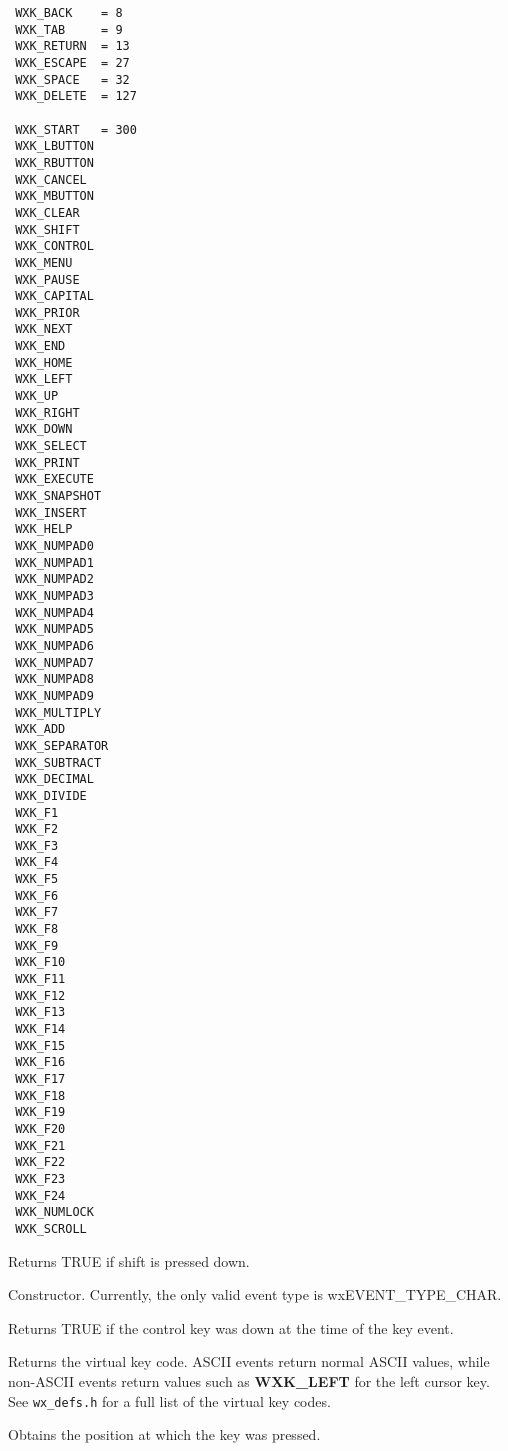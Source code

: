 \begin{verbatim}
 WXK_BACK    = 8
 WXK_TAB     = 9
 WXK_RETURN  = 13
 WXK_ESCAPE  = 27
 WXK_SPACE   = 32
 WXK_DELETE  = 127

 WXK_START   = 300
 WXK_LBUTTON
 WXK_RBUTTON
 WXK_CANCEL
 WXK_MBUTTON
 WXK_CLEAR
 WXK_SHIFT
 WXK_CONTROL
 WXK_MENU
 WXK_PAUSE
 WXK_CAPITAL
 WXK_PRIOR
 WXK_NEXT
 WXK_END
 WXK_HOME
 WXK_LEFT
 WXK_UP
 WXK_RIGHT
 WXK_DOWN
 WXK_SELECT
 WXK_PRINT
 WXK_EXECUTE
 WXK_SNAPSHOT
 WXK_INSERT
 WXK_HELP
 WXK_NUMPAD0
 WXK_NUMPAD1
 WXK_NUMPAD2
 WXK_NUMPAD3
 WXK_NUMPAD4
 WXK_NUMPAD5
 WXK_NUMPAD6
 WXK_NUMPAD7
 WXK_NUMPAD8
 WXK_NUMPAD9
 WXK_MULTIPLY
 WXK_ADD
 WXK_SEPARATOR
 WXK_SUBTRACT
 WXK_DECIMAL
 WXK_DIVIDE
 WXK_F1
 WXK_F2
 WXK_F3
 WXK_F4
 WXK_F5
 WXK_F6
 WXK_F7
 WXK_F8
 WXK_F9
 WXK_F10
 WXK_F11
 WXK_F12
 WXK_F13
 WXK_F14
 WXK_F15
 WXK_F16
 WXK_F17
 WXK_F18
 WXK_F19
 WXK_F20
 WXK_F21
 WXK_F22
 WXK_F23
 WXK_F24
 WXK_NUMLOCK
 WXK_SCROLL 
\end{verbatim}



Returns TRUE if shift is pressed down.



Constructor. Currently, the only valid event type is wxEVENT\_TYPE\_CHAR.



Returns TRUE if the control key was down at the time of the key event.



Returns the virtual key code. ASCII events return normal ASCII values,
while non-ASCII events return values such as {\bf WXK\_LEFT} for the
left cursor key. See {\tt wx\_defs.h} for a full list of the virtual key codes.



Obtains the position at which the key was pressed.



